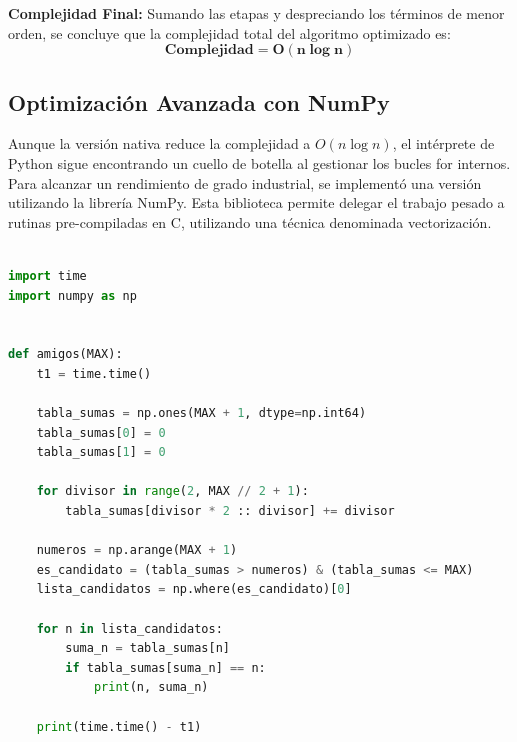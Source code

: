 \textbf{Complejidad Final:} Sumando las etapas y despreciando los términos de menor orden, se concluye que la complejidad total del algoritmo optimizado es:
\[ \boxed{\textbf{Complejidad} = \bm{O(n \log n)}} \]

\subsection{Optimización Avanzada con NumPy}
Aunque la versión nativa reduce la complejidad a $O(n\log n)$, el intérprete de Python sigue encontrando un cuello de botella al gestionar los bucles for internos. Para alcanzar un rendimiento de grado industrial, se implementó una versión utilizando la librería NumPy.
Esta biblioteca permite delegar el trabajo pesado a rutinas pre-compiladas en C, utilizando una técnica denominada vectorización.

\begin{lstlisting}[language=Python]

import time
import numpy as np


def amigos(MAX):
    t1 = time.time()

    tabla_sumas = np.ones(MAX + 1, dtype=np.int64)
    tabla_sumas[0] = 0
    tabla_sumas[1] = 0

    for divisor in range(2, MAX // 2 + 1):
        tabla_sumas[divisor * 2 :: divisor] += divisor

    numeros = np.arange(MAX + 1)
    es_candidato = (tabla_sumas > numeros) & (tabla_sumas <= MAX)
    lista_candidatos = np.where(es_candidato)[0]

    for n in lista_candidatos:
        suma_n = tabla_sumas[n]
        if tabla_sumas[suma_n] == n:
            print(n, suma_n)

    print(time.time() - t1)
\end{lstlisting}

